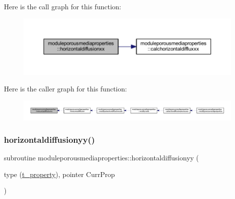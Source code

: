 Here is the call graph for this function\+:\nopagebreak
\begin{figure}[H]
\begin{center}
\leavevmode
\includegraphics[width=350pt]{namespacemoduleporousmediaproperties_a3a2fc7f94588508e3f73f83cdb76a6af_cgraph}
\end{center}
\end{figure}
Here is the caller graph for this function\+:\nopagebreak
\begin{figure}[H]
\begin{center}
\leavevmode
\includegraphics[width=350pt]{namespacemoduleporousmediaproperties_a3a2fc7f94588508e3f73f83cdb76a6af_icgraph}
\end{center}
\end{figure}
\mbox{\label{namespacemoduleporousmediaproperties_a9bd1af2c6e3a19167f538d7c25d74e6b}} 
\subsubsection{\texorpdfstring{horizontaldiffusionyy()}{horizontaldiffusionyy()}}
{\footnotesize\ttfamily subroutine moduleporousmediaproperties\+::horizontaldiffusionyy (\begin{DoxyParamCaption}\item[{type (\mbox{\hyperlink{structmoduleporousmediaproperties_1_1t__property}{t\+\_\+property}}), pointer}]{Curr\+Prop }\end{DoxyParamCaption})\hspace{0.3cm}{\ttfamily [private]}}


